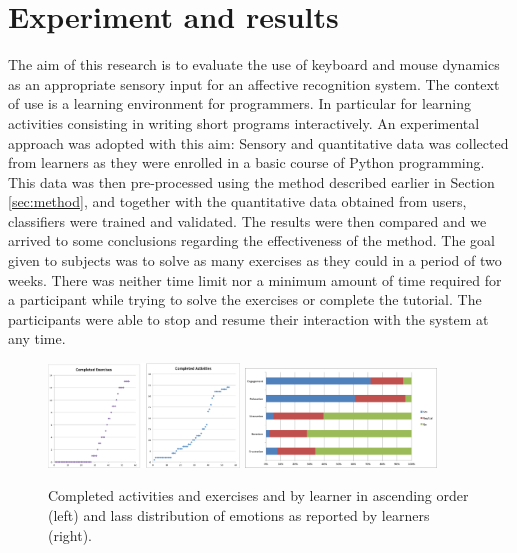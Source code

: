 \documentclass[a4paper]{llncs}
\begin{document}
\section{Experiment and results}
\label{sec:exp}
The aim of this research is to evaluate the use of keyboard
and mouse dynamics as an appropriate sensory input for an affective recognition
system. The context of use is a learning environment for programmers. In
particular for learning activities consisting in writing short programs
interactively. An experimental approach was adopted with this aim: Sensory and
quantitative data was collected from learners as they were enrolled in a basic
course of Python programming. This data was then pre-processed using the method
described earlier in Section \ref{sec:method}, and together with the quantitative data obtained from users,
classifiers were trained and validated. The results were then compared
and we arrived to some conclusions regarding the effectiveness of the method. The goal given to
subjects was to solve as many exercises as they could in a period of two weeks.
There was neither time limit nor a minimum amount of time required for a
participant while trying to solve the exercises or complete the tutorial. The
participants were able to stop and resume their interaction with the system at
any time.
%
\begin{figure}[!t] 
\centering 
\includegraphics[width=2in]{Completed.png} 
\includegraphics[width=2in]{classDist.png} 
\caption{Completed activities and exercises and by learner in ascending order (left) and lass distribution of emotions as reported by learners (right).}
\label{fig_completed} 
\end{figure}
\end{document}
